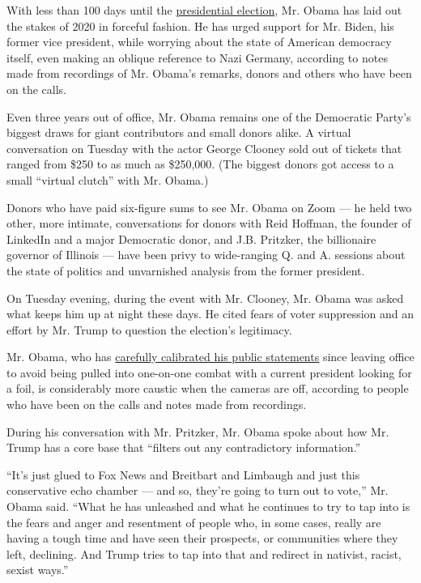 With less than 100 days until the
\href{https://www.nytimes.com/2020/07/30/us/politics/trump-postpone-election.html}{presidential
election}, Mr. Obama has laid out the stakes of 2020 in forceful
fashion. He has urged support for Mr. Biden, his former vice president,
while worrying about the state of American democracy itself, even making
an oblique reference to Nazi Germany, according to notes made from
recordings of Mr. Obama's remarks, donors and others who have been on
the calls.

Even three years out of office, Mr. Obama remains one of the Democratic
Party's biggest draws for giant contributors and small donors alike. A
virtual conversation on Tuesday with the actor George Clooney sold out
of tickets that ranged from \$250 to as much as \$250,000. (The biggest
donors got access to a small ``virtual clutch'' with Mr. Obama.)

Donors who have paid six-figure sums to see Mr. Obama on Zoom --- he
held two other, more intimate, conversations for donors with Reid
Hoffman, the founder of LinkedIn and a major Democratic donor, and J.B.
Pritzker, the billionaire governor of Illinois --- have been privy to
wide-ranging Q. and A. sessions about the state of politics and
unvarnished analysis from the former president.

On Tuesday evening, during the event with Mr. Clooney, Mr. Obama was
asked what keeps him up at night these days. He cited fears of voter
suppression and an effort by Mr. Trump to question the election's
legitimacy.

Mr. Obama, who has
\href{https://www.nytimes.com/2020/06/28/us/politics/obama-biden-trump.html}{carefully
calibrated his public statements} since leaving office to avoid being
pulled into one-on-one combat with a current president looking for a
foil, is considerably more caustic when the cameras are off, according
to people who have been on the calls and notes made from recordings.

During his conversation with Mr. Pritzker, Mr. Obama spoke about how Mr.
Trump has a core base that ``filters out any contradictory
information.''

``It's just glued to Fox News and Breitbart and Limbaugh and just this
conservative echo chamber --- and so, they're going to turn out to
vote,'' Mr. Obama said. ``What he has unleashed and what he continues to
try to tap into is the fears and anger and resentment of people who, in
some cases, really are having a tough time and have seen their
prospects, or communities where they left, declining. And Trump tries to
tap into that and redirect in nativist, racist, sexist ways.''

